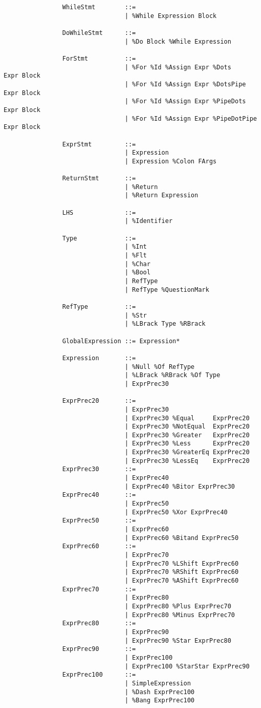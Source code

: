 \documentclass{article}
\begin{document}
\begin{verbatim}
				WhileStmt        ::=
				                 | %While Expression Block
				
				DoWhileStmt      ::=
				                 | %Do Block %While Expression
				                 
				ForStmt          ::=
				                 | %For %Id %Assign Expr %Dots        Expr Block
				                 | %For %Id %Assign Expr %DotsPipe    Expr Block
				                 | %For %Id %Assign Expr %PipeDots    Expr Block
				                 | %For %Id %Assign Expr %PipeDotPipe Expr Block
				                 
				ExprStmt         ::=
				                 | Expression
				                 | Expression %Colon FArgs
				                 
				ReturnStmt       ::=
				                 | %Return
				                 | %Return Expression
				                 
				LHS              ::=
				                 | %Identifier
				                 
				Type             ::=
				                 | %Int
				                 | %Flt
				                 | %Char
				                 | %Bool
				                 | RefType
				                 | RefType %QuestionMark
				                 
				RefType          ::=
				                 | %Str
				                 | %LBrack Type %RBrack
				                 
				GlobalExpression ::= Expression*
			
				Expression       ::=
				                 | %Null %Of RefType
				                 | %LBrack %RBrack %Of Type
				                 | ExprPrec30
				
				ExprPrec20       ::= 
				                 | ExprPrec30
				                 | ExprPrec30 %Equal     ExprPrec20
				                 | ExprPrec30 %NotEqual  ExprPrec20
				                 | ExprPrec30 %Greater   ExprPrec20
				                 | ExprPrec30 %Less      ExprPrec20
				                 | ExprPrec30 %GreaterEq ExprPrec20
				                 | ExprPrec30 %LessEq    ExprPrec20
				ExprPrec30       ::=
				                 | ExprPrec40
				                 | ExprPrec40 %Bitor ExprPrec30
				ExprPrec40       ::=
				                 | ExprPrec50
				                 | ExprPrec50 %Xor ExprPrec40
				ExprPrec50       ::=
				                 | ExprPrec60
				                 | ExprPrec60 %Bitand ExprPrec50
				ExprPrec60       ::=
				                 | ExprPrec70
				                 | ExprPrec70 %LShift ExprPrec60
				                 | ExprPrec70 %RShift ExprPrec60
				                 | ExprPrec70 %AShift ExprPrec60
				ExprPrec70       ::=
				                 | ExprPrec80
				                 | ExprPrec80 %Plus ExprPrec70
				                 | ExprPrec80 %Minus ExprPrec70
				ExprPrec80       ::=
				                 | ExprPrec90
				                 | ExprPrec90 %Star ExprPrec80
				ExprPrec90       ::=
				                 | ExprPrec100
				                 | ExprPrec100 %StarStar ExprPrec90
				ExprPrec100      ::=
				                 | SimpleExpression
				                 | %Dash ExprPrec100
				                 | %Bang ExprPrec100
				                 

\end{verbatim}
\end{document}
